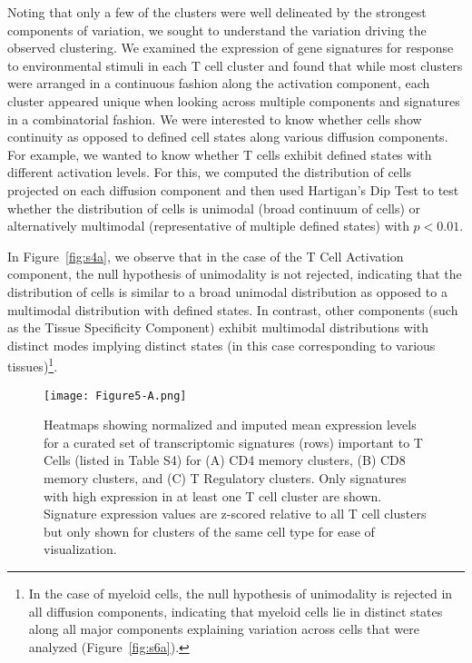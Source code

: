 Noting that only a few of the clusters were well delineated by the strongest components of variation, we sought to understand the variation driving the observed clustering.
We examined the expression of gene signatures for response to environmental stimuli in each T cell cluster and found that while most clusters were arranged in a continuous fashion along the activation component, each cluster appeared unique when looking across multiple components and signatures in a combinatorial fashion. 
We were interested to know whether cells show continuity as opposed to defined cell states along various diffusion components.
For example, we wanted to know whether T cells exhibit defined states with different activation levels.
For this, we computed the distribution of cells projected on each diffusion component and then used Hartigan's Dip Test \citep{Hartigan1985} to test whether the distribution of cells is unimodal (broad continuum of cells) or alternatively multimodal (representative of multiple defined states) with $p<0.01$.

In Figure~\ref{fig:s4a}, we observe that in the case of the T Cell Activation component, the null hypothesis of unimodality is not rejected, indicating that the distribution of cells is similar to a broad unimodal distribution as opposed to a multimodal distribution with defined states. 
In contrast, other components (such as the Tissue Specificity Component) exhibit multimodal distributions with distinct modes implying distinct states (in this case corresponding to various tissues)\footnote{In the case of myeloid cells, the null hypothesis of unimodality is rejected in all diffusion components, indicating that myeloid cells lie in distinct states along all major components explaining variation across cells that were analyzed (Figure~\ref{fig:s6a}).}.

\begin{figure}
\centering
\texttt{[image: Figure5-A.png]}
\caption{Heatmaps showing normalized and imputed mean expression levels for a curated set of transcriptomic signatures (rows) important to T Cells (listed in Table S4) for (A) CD4 memory clusters, (B) CD8 memory clusters, and (C) T Regulatory clusters.
  Only signatures with high expression in at least one T cell cluster are shown.
  Signature expression values are z-scored relative to all T cell clusters but only shown for clusters of the same cell type for ease of visualization.
}
\label{fig:5a}
\end{figure}

